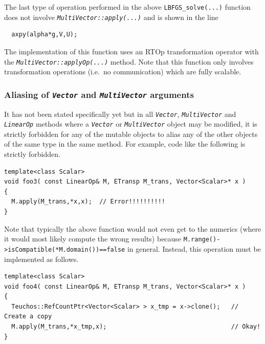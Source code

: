 The last type of operation performed in the above
{}\texttt{LBFGS\_solve(...)}  function does not involve
{}\texttt{\textit{Multi\-Vector\-::apply(\-...)}} and is shown in the
line

{\scriptsize\begin{verbatim}
  axpy(alpha*g,V,U);
\end{verbatim}}

{}\noindent{}The implementation of this function uses an RTOp
transformation operator with the
{}\texttt{\textit{Multi\-Vector\-::applyOp(\-...)}}  method.  Note
that this function only involves transformation operations (i.e.~no
communication) which are fully scalable.

%
\subsubsection{Aliasing of {}\texttt{\textit{Vector}} and {}\texttt{\textit{Multi\-Vector}} arguments}
\label{tsfcore:sec:aliasing}
%

It has not been stated specifically yet but in all
{}\texttt{\textit{Vector}}, {}\texttt{\textit{Multi\-Vector}} and
{}\texttt{\textit{LinearOp}} methods where a
{}\texttt{\textit{Vector}} or {}\texttt{\textit{Multi\-Vector}} object
may be modified, it is strictly forbidden for any of the mutable
objects to alias any of the other objects of the same type in the same
method.  For example, code like the following is strictly forbidden.

{\scriptsize\begin{verbatim}
template<class Scalar>
void foo3( const LinearOp& M, ETransp M_trans, Vector<Scalar>* x )
{
  M.apply(M_trans,*x,x);  // Error!!!!!!!!!!
}
\end{verbatim}}

{}\noindent{}Note that typically the above function would not even get
to the numerics (where it would most likely compute the wrong results)
because {}\texttt{M.range()->isCompatible(*M.domain())==false} in
general.  Instead, this operation must be implemented as follows.

{\scriptsize\begin{verbatim}
template<class Scalar>
void foo4( const LinearOp& M, ETransp M_trans, Vector<Scalar>* x )
{
  Teuchos::RefCountPtr<Vector<Scalar> > x_tmp = x->clone();   // Create a copy
  M.apply(M_trans,*x_tmp,x);                                  // Okay!
}
\end{verbatim}}

